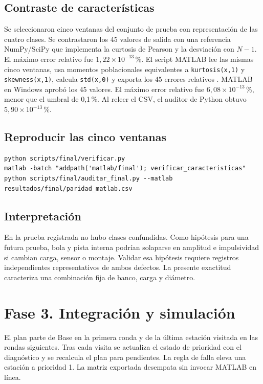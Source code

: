 \documentclass[conference,letterpaper]{IEEEtran}
\begin{document}
\subsection{Contraste de características}
Se seleccionaron cinco ventanas del conjunto de prueba con representación de las cuatro clases. Se contrastaron los 45 valores de salida con una referencia NumPy/SciPy que implementa la curtosis de Pearson y la desviación con $N-1$. El máximo error relativo fue $1{,}22\times10^{-13}$\,\%. El script MATLAB lee las mismas cinco ventanas, usa momentos poblacionales equivalentes a \texttt{kurtosis(x,1)} y \texttt{skewness(x,1)}, calcula \texttt{std(x,0)} y exporta los 45 errores relativos \cite{matlab}. MATLAB en Windows aprobó los 45 valores. El máximo error relativo fue $6{,}08\times 10^{-13}$\,\%, menor que el umbral de 0,1\,\%. Al releer el CSV, el auditor de Python obtuvo $5{,}90\times 10^{-13}$\,\%.


\subsection{Reproducir las cinco ventanas}
\begin{lstlisting}
python scripts/final/verificar.py
matlab -batch "addpath('matlab/final'); verificar_caracteristicas"
python scripts/final/auditar_final.py --matlab resultados/final/paridad_matlab.csv
\end{lstlisting}
\subsection{Interpretación}
En la prueba registrada no hubo clases confundidas. Como hipótesis para una futura prueba, bola y pista interna podrían solaparse en amplitud e impulsividad si cambian carga, sensor o montaje. Validar esa hipótesis requiere registros independientes representativos de ambos defectos. La presente exactitud caracteriza una combinación fija de banco, carga y diámetro.
\clearpage

\section{Fase 3. Integración y simulación}
El plan parte de Base en la primera ronda y de la última estación visitada en las rondas siguientes. Tras cada visita se actualiza el estado de prioridad con el diagnóstico y se recalcula el plan para pendientes. La regla de falla eleva una estación a prioridad 1. La matriz exportada desempata sin invocar MATLAB en línea.
\end{document}
